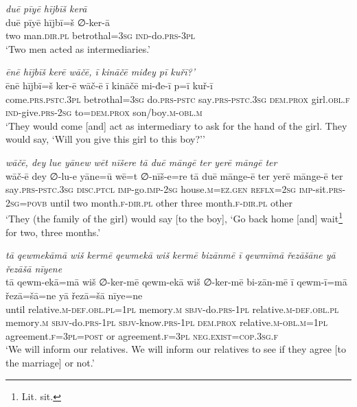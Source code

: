 \ea \label{ŽE.79}
\textit{duē pīyē hījbīš kerā} \\ 
\gll duē pīyē hījbī=š ∅-ker-ā \\ 
 two man\textsc{.dir}\textsc{.pl} betrothal\textsc{=3sg} \textsc{ind-}do\textsc{.prs}\textsc{-3pl} \\ 
\glt `Two men acted as intermediaries.'
\z 
 
\ea \label{ŽE.80}
\textit{ēnē hījbīš kerē wāčē, ī kināčē miđey pī kuřī?’} \\ 
\gll ēnē hījbī=š ker-ē wāč-ē ī kināčē mi-đe-ī p=ī kuř-ī \\ 
 come\textsc{.prs}\textsc{.pstc}\textsc{.3pl} betrothal\textsc{=3sg} do\textsc{.prs}\textsc{-pstc} say\textsc{.prs-pstc}\textsc{.3sg} \textsc{dem.prox} girl\textsc{.obl}\textsc{.f} \textsc{ind-}give\textsc{.prs}-\textsc{2sg} to=\textsc{dem.prox} son/boy\textsc{.m}\textsc{-obl}\textsc{.m} \\ 
\glt `They would come [and] act as intermediary to ask for the hand of the girl. They would say, ‘Will you give this girl to this boy?’'
\z 
 
\ea \label{ŽE.82}
\textit{wāčē, dey lue yānew wēt nīšere tā duē māngē ter yerē māngē ter} \\ 
\gll wāč-ē dey ∅-lu-e yāne=ū wē=t ∅-nīš-e=re tā duē mānge-ē ter yerē mānge-ē ter \\ 
 say\textsc{.prs-pstc}\textsc{.3sg} \textsc{disc}.\textsc{ptcl} \textsc{imp-}go.\textsc{imp-}\textsc{2sg} house\textsc{.m}\textsc{\textsc{=ez.gen}} \textsc{reflx}\textsc{=\textsc{2sg}} \textsc{imp-}sit\textsc{.prs}-\textsc{2sg}\textsc{=\textsc{povb}} until two month\textsc{.f}\textsc{-dir}\textsc{.pl} other three month\textsc{.f}\textsc{-dir}\textsc{.pl} other \\ 
\glt `They (the family of the girl) would say [to the boy], ‘Go back home [and] wait\footnote{Lit. sit.} for two, three months.'
\z 
 
\ea \label{ŽE.83}
\textit{tā qewmekāmā wiš kermē qewmekā wiš kermē bizānmē ī qewmīmā řezāšāne yā řezāšā nīyene} \\ 
\gll tā qewm-ekā=mā wiš ∅-ker-mē qewm-ekā wiš ∅-ker-mē bi-zān-mē ī qewm-ī=mā řezā=šā=ne yā řezā=šā nīye=ne \\ 
 until relative\textsc{.m}\textsc{-def}\textsc{.obl}\textsc{.pl}\textsc{=1pl} memory\textsc{.m} \textsc{sbjv-}do\textsc{.prs}\textsc{-1pl} relative\textsc{.m}\textsc{-def}\textsc{.obl}\textsc{.pl} memory\textsc{.m} \textsc{sbjv-}do\textsc{.prs}\textsc{-1pl} \textsc{sbjv-}know\textsc{.prs}\textsc{-1pl} \textsc{dem.prox} relative\textsc{.m}\textsc{-obl}\textsc{.m}\textsc{=1pl} agreement\textsc{.f}\textsc{=3pl}\textsc{=\textsc{post}} or agreement\textsc{.f}\textsc{=3pl} \textsc{\textsc{neg.}exist}\textsc{=cop}\textsc{.3sg}\textsc{.f} \\ 
\glt `We will inform our relatives. We will inform our relatives to see if they agree [to the  marriage] or not.'
\z 
 
